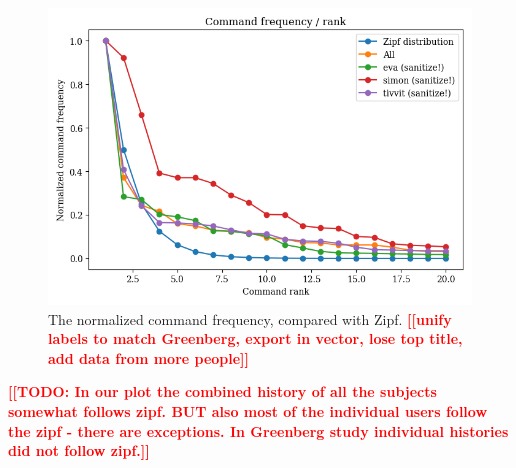 \documentclass[thesis=M,english]{FITthesis}[2012/10/20]
\newcommand{\todotext}[1]{\textcolor{red}{\textbf{[[#1]]}}}
\newcommand{\tmpframe}[1]{\fbox{#1}}
\renewcommand{\tmpframe}[1]{#1}
\begin{document}
\begin{figure}
  \tmpframe{\includegraphics[width=\linewidth]{figures/greenberg_new/plot_zipf-cmd-frq.png}}
  \caption{The normalized command frequency, compared with Zipf. \todotext{unify labels to match Greenberg, export in vector, lose top title, add data from more people}}
\end{figure}

\todotext{TODO: In our plot the combined history of all the subjects somewhat follows zipf. BUT also most of the individual users follow the zipf - there are exceptions. In Greenberg study individual histories did not follow zipf.}

\end{document}
